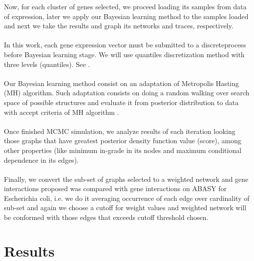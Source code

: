 \documentclass{bmcart}
\begin{document}
Now, for each cluster of genes selected, we proceed loading its samples from data of expression, later we apply our Bayesian learning method to the samples loaded and next we take the results and graph its networks and traces, respectively.\\
\\
In this work, each gene expression vector must be submitted to a discreteprocess before Bayesian learning stage. We will use quantiles discretization method with three levels (quantiles). See \cite{dey2010bayesian}.
\\
\\
Our Bayesian learning method consist on an adaptation of Metropolis Hasting (MH) algorithm. Such adaptation consists on doing a random walking over search space of possible structures and evaluate it from posterior distribution to data with accept criteria of MH algorithm \cite{KollerFriedman09}.\\
\\
Once finished MCMC simulation, we analyze results of each iteration looking those graphs that have greatest posterior density function value (score), among other properties (like minimum in-grade in its nodes and maximum conditional dependence in its edges).\\
\\
Finally, we convert the sub-set of graphs selected to a weighted network and gene interactions proposed was compared with gene interactions on ABASY for Escherichia coli, i.e. we do it averaging occurrence of each edge over cardinality of sub-set and again we choose a cutoff for weight values and weighted network will be conformed with those edges that exceeds cutoff threshold chosen.

\section*{Results}
\end{document}
